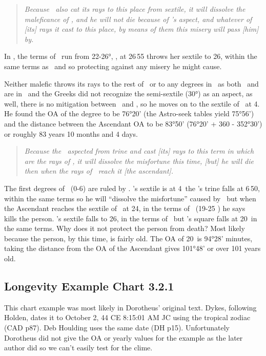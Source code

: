 \begin{quote}
\textsl{Because  \Venus\, also cat its rays to this place from sextile, it will dissolve the maleficance of \Mars, and he will not die because of \Venus's aspect, and whatever of [its] rays it cast to this place, by means of them this misery will pass [him] by.
}
\end{quote}

In \Taurus, the terms of \Saturn\, run from 22-26°, \Venus, at 26\Pisces\,55 throws her sextile to 26\Taurus, within the same terms as \Mars\, and so protecting against any misery he might cause.

Neither   malefic throws its rays to the rest of \Taurus\, or to any degrees in \Gemini\, as both \Saturn\, and \Mars\, are in \Taurus\, and the Greeks did not recognize the semi-sextile (30°) as an aspect, as well, there is no mitigation between \Taurus\, and \Gemini, so he moves on to the sextile of \Saturn\, at 4. He found the OA of the degree to be 76°20' (the Astro-seek tables yield 75°56') and the distance between the Ascendant OA to be 83°50' (76°20' + 360 - 352°30') or roughly 83 years 10 months and 4 days.
\begin{quote}
\textsl{Because the \Sun\, aspected from trine and cast [its] rays to this term in which are the rays of \Saturn, it will dissolve the misfortune this time, [but] he will die then when the rays of \Mars\, reach it [the ascendant].}
\end{quote}

The first degrees of \Cancer\, (0-6) are ruled by \Mars. \Saturn's sextile is at 4\Cancer\, the \Sun's trine falls at 6\Cancer\,50, within the same terms so he will ``dissolve the misfortune'' caused by \Saturn\, but when the Ascendant reaches the sextile of \Mars\, at 24\Cancer, in the terms of \Jupiter\, (19-25 \Cancer) he says  \Mars\, kills the person. \Venus's sextile falls to 26\Cancer, in the terms of \Saturn\, but \Jupiter's square falls at 20\Cancer\, in the same terms. Why does it not protect the person from death?  Most likely because the person, by this time, is fairly old. The OA of 20\Cancer\, is 94°28' minutes, taking the distance from the OA of the Ascendant gives 101°48' or over 101 years old.

\newpage
\subsection{Longevity Example Chart 3.2.1}
\begin{mdframed}[backgroundcolor=cyan!5, rightmargin=1em, leftmargin=1em]
This chart example was most likely in Dorotheus' original text. Dykes, following Holden, dates it to October 2, 44 CE 8:15:01 AM JC using the tropical zodiac (CAD p87).  Deb Houlding uses the same date (DH p15). Unfortunately Dorotheus did not give the OA or yearly values for the example as the later author did so we can't easily test for the clime.
\end{mdframed}

